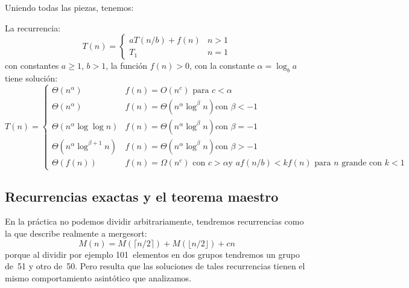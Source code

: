   Uniendo todas las piezas,
  tenemos:
  \begin{theorem}
    \label{theo:master-theorem}
    La recurrencia:
    \begin{equation}
    T(n)
      = \begin{cases}
          a T(n / b) + f(n) & n > 1 \\
          T_1		    & n = 1
        \end{cases}
    \end{equation}
    con constantes \(a \ge 1\), \(b > 1\),
    la función \(f(n) > 0\),
    con la constante \(\alpha = \log_b a\)
    tiene solución:
    \begin{equation*}
      T(n)
        = \begin{cases}
            \Theta(n^{\alpha})
               & \text{\(f(n) = O(n^c)\) para \(c < \alpha\)} \\
            \Theta(n^{\alpha})
               & \text{\(f(n) = \Theta(n^{\alpha} \log^\beta n)\)
                       con \(\beta < -1\)} \\
            \Theta(n^{\alpha} \log \log n)
               & \text{\(f(n) = \Theta(n^{\alpha} \log^\beta n)\)
                       con \(\beta = -1\)} \\
            \Theta(n^{\alpha} \log^{\beta + 1} n)
               & \text{\(f(n) = \Theta(n^{\alpha} \log^\beta n)\)
                       con \(\beta > -1\)} \\
            \Theta(f(n))
              & \text{\(f(n) = \Omega(n^c)\) con \(c > \alpha\)
                      y \(a f(n / b) < k f(n)\) para \(n\) grande
                      con \(k < 1\)}
          \end{cases}
    \end{equation*}
  \end{theorem}

\subsection{Recurrencias exactas y el teorema maestro}
\label{sec:exact-recurrence-master-theorem}

  En la práctica no podemos dividir arbitrariamente,
  tendremos recurrencias
  como la que describe realmente a mergesort:
  \begin{equation*}
    M(n)
      = M(\lceil n / 2 \rceil) + M(\lfloor n / 2 \rfloor) + c n
  \end{equation*}
  porque al dividir por ejemplo \num{101}~elementos en dos grupos
  tendremos un grupo de~\num{51} y otro de~\num{50}.
  Pero resulta que las soluciones de tales recurrencias
  tienen el mismo comportamiento asintótico que analizamos.


